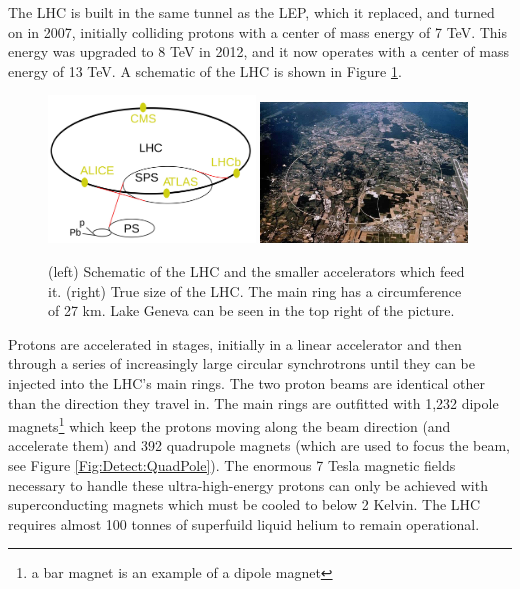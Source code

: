 The LHC is built in the same tunnel as the LEP, which it replaced, and turned on in 2007, initially colliding protons with a center of mass energy of 7 TeV. This energy was upgraded to 8 TeV in 2012, and it now operates with a center of mass energy of 13 TeV. A schematic of the LHC is shown in Figure \ref{Fig:Detect:LHC}.
\begin{figure}[h!]
    \centering
        \includegraphics[width=0.49\textwidth]{F3/LHC}
        \includegraphics[width=0.49\textwidth]{F3/LHC2}
        \caption{(left) Schematic of the LHC and the smaller accelerators which feed it. (right) True size of the LHC. The main ring has a circumference of 27 km. Lake Geneva can be seen in the top right of the picture.}
        \label{Fig:Detect:LHC}
\end{figure}
Protons are accelerated in stages, initially in a linear accelerator and then through a series of increasingly large circular synchrotrons until they can be injected into the LHC's main rings. The two proton beams are identical other than the direction they travel in. The main rings are outfitted with 1,232 dipole magnets\footnote{a bar magnet is an example of a dipole magnet} which keep the protons moving along the beam direction (and accelerate them) and 392 quadrupole magnets (which are used to focus the beam, see Figure \ref{Fig:Detect:QuadPole}). The enormous 7 Tesla magnetic fields necessary to handle these ultra-high-energy protons can only be achieved with superconducting magnets which must be cooled to below 2 Kelvin. The LHC requires almost 100 tonnes of superfuild liquid helium to remain operational.
